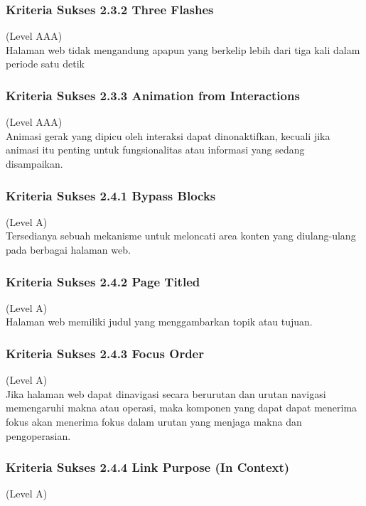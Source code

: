 \subsubsection{Kriteria Sukses 2.3.2 Three Flashes}
\label{sec:kriteria_2.3.2}
(Level AAA) \\

Halaman web tidak mengandung apapun yang berkelip lebih dari tiga kali dalam periode satu detik


\subsubsection{Kriteria Sukses 2.3.3 Animation from Interactions}
\label{sec:kriteria_2.3.3}
(Level AAA) \\

Animasi gerak yang dipicu oleh interaksi dapat dinonaktifkan, kecuali jika animasi itu penting untuk fungsionalitas atau informasi yang sedang disampaikan.

\subsubsection{Kriteria Sukses 2.4.1 Bypass Blocks}
\label{sec:kriteria_2.4.1}
(Level A) \\

Tersedianya sebuah mekanisme untuk meloncati area konten yang diulang-ulang pada berbagai halaman web.

\subsubsection{Kriteria Sukses 2.4.2 Page Titled}
\label{sec:kriteria_2.4.2}
(Level A) \\

Halaman web memiliki judul yang menggambarkan topik atau tujuan.

\subsubsection{Kriteria Sukses 2.4.3 Focus Order}
\label{sec:kriteria_2.4.3}
(Level A) \\

Jika halaman web dapat dinavigasi secara berurutan dan urutan navigasi memengaruhi makna atau operasi, maka komponen yang dapat dapat menerima fokus akan menerima fokus dalam urutan yang menjaga makna dan pengoperasian.

\subsubsection{Kriteria Sukses 2.4.4 Link Purpose (In Context)}
\label{sec:kriteria_2.4.4}
(Level A) \\

